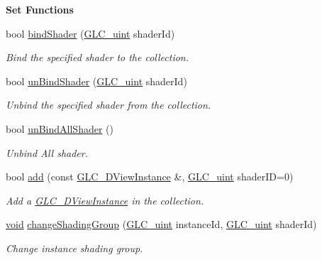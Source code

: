 \begin{Indent}{\bf Set Functions}\par
\begin{DoxyCompactItemize}
\item 
bool \hyperlink{class_g_l_c__3_d_view_collection_ac38acb7b53f7243d3c148ccd8d318185}{bind\-Shader} (\hyperlink{glc__global_8h_abf950976fabed69026558df8e2da6c6b}{G\-L\-C\-\_\-uint} shader\-Id)
\begin{DoxyCompactList}\small\item\em Bind the specified shader to the collection. \end{DoxyCompactList}\item 
bool \hyperlink{class_g_l_c__3_d_view_collection_a2aab5c63e463c2857491597ca2d352f3}{un\-Bind\-Shader} (\hyperlink{glc__global_8h_abf950976fabed69026558df8e2da6c6b}{G\-L\-C\-\_\-uint} shader\-Id)
\begin{DoxyCompactList}\small\item\em Unbind the specified shader from the collection. \end{DoxyCompactList}\item 
bool \hyperlink{class_g_l_c__3_d_view_collection_a32036b17e6468450ead14705fb9bdde6}{un\-Bind\-All\-Shader} ()
\begin{DoxyCompactList}\small\item\em Unbind All shader. \end{DoxyCompactList}\item 
bool \hyperlink{class_g_l_c__3_d_view_collection_a2769e3f427ffda8383c829d7e748793f}{add} (const \hyperlink{class_g_l_c__3_d_view_instance}{G\-L\-C\-\_\-D\-View\-Instance} \&, \hyperlink{glc__global_8h_abf950976fabed69026558df8e2da6c6b}{G\-L\-C\-\_\-uint} shader\-I\-D=0)
\begin{DoxyCompactList}\small\item\em Add a \hyperlink{class_g_l_c__3_d_view_instance}{G\-L\-C\-\_\-D\-View\-Instance} in the collection. \end{DoxyCompactList}\item 
\hyperlink{group___u_a_v_objects_plugin_ga444cf2ff3f0ecbe028adce838d373f5c}{void} \hyperlink{class_g_l_c__3_d_view_collection_ae7a6daec0b96237d84000ab172f8244f}{change\-Shading\-Group} (\hyperlink{glc__global_8h_abf950976fabed69026558df8e2da6c6b}{G\-L\-C\-\_\-uint} instance\-Id, \hyperlink{glc__global_8h_abf950976fabed69026558df8e2da6c6b}{G\-L\-C\-\_\-uint} shader\-Id)
\begin{DoxyCompactList}\small\item\em Change instance shading group. \end{DoxyCompactList}\item 

\end{DoxyCompactItemize}
\end{Indent}
